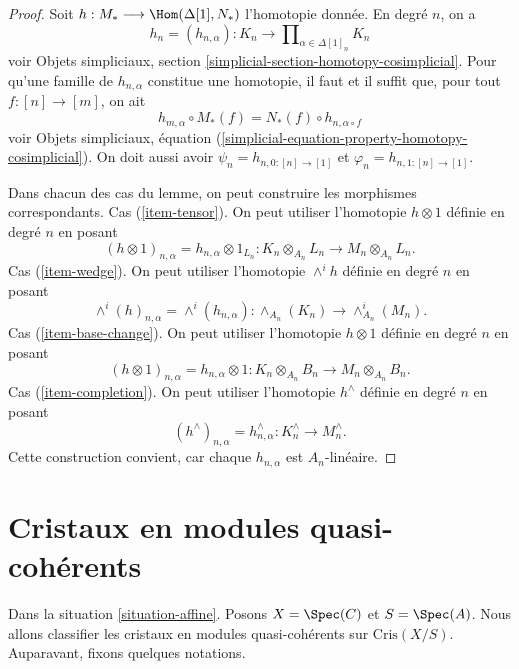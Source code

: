 \begin{proof}
Soit $h : M_* \longrightarrow \Hom(\Delta[1], N_*)$ l'homotopie
donnée. En degré $n$, on a
$$
h_n = (h_{n, \alpha}) :
K_n \longrightarrow
\prod\nolimits_{\alpha \in \Delta[1]_n} K_n
$$
voir Objets simpliciaux, section \ref{simplicial-section-homotopy-cosimplicial}.
Pour qu'une famille de $h_{n, \alpha}$ constitue une homotopie,
il faut et il suffit que, pour tout $f : [n] \to [m]$, on
ait
$$
h_{m, \alpha} \circ M_*(f) = N_*(f) \circ h_{n, \alpha \circ f}
$$
voir
Objets simpliciaux, équation (\ref{simplicial-equation-property-homotopy-cosimplicial}).
On doit aussi avoir $\psi_n = h_{n, 0 : [n] \to [1]}$ et
$\varphi_n = h_{n, 1 : [n] \to [1]}$.

\medskip\noindent
Dans chacun des cas du lemme, on peut construire les morphismes correspondants.
Cas (\ref{item-tensor}). On peut utiliser l'homotopie $h \otimes 1$ définie
en degré $n$ en posant
$$
(h \otimes 1)_{n, \alpha} = h_{n, \alpha} \otimes 1_{L_n} :
K_n \otimes_{A_n} L_n
\longrightarrow
M_n \otimes_{A_n} L_n.
$$
Cas (\ref{item-wedge}). On peut utiliser l'homotopie $\wedge^ih$ définie
en degré $n$ en posant
$$
\wedge^i(h)_{n, \alpha} = \wedge^i(h_{n, \alpha}) :
\wedge_{A_n}(K_n)
\longrightarrow
\wedge^i_{A_n}(M_n).
$$
Cas (\ref{item-base-change}). On peut utiliser l'homotopie $h \otimes 1$ définie
en degré $n$ en posant
$$
(h \otimes 1)_{n, \alpha} = h_{n, \alpha} \otimes 1 :
K_n \otimes_{A_n} B_n
\longrightarrow
M_n \otimes_{A_n} B_n.
$$
Cas (\ref{item-completion}). On peut utiliser l'homotopie $h^\wedge$ définie
en degré $n$ en posant
$$
(h^\wedge)_{n, \alpha} = h_{n, \alpha}^\wedge :
K_n^\wedge
\longrightarrow
M_n^\wedge.
$$
Cette construction convient, car chaque $h_{n, \alpha}$ est $A_n$-linéaire.
\end{proof}






\section{Cristaux en modules quasi-cohérents}
\label{section-quasi-coherent-crystals}

\noindent
Dans la situation \ref{situation-affine}.
Posons $X = \Spec(C)$ et $S = \Spec(A)$. Nous allons
classifier les cristaux en modules quasi-cohérents sur $\text{Cris}(X/S)$.
Auparavant, fixons quelques notations.

